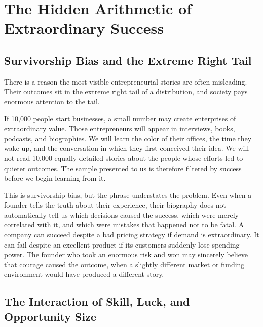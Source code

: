 \section{The Hidden Arithmetic of Extraordinary Success}

\subsection{Survivorship Bias and the Extreme Right Tail}

There is a reason the most visible entrepreneurial stories are often misleading. Their outcomes sit in the extreme right tail of a distribution, and society pays enormous attention to the tail.

If 10,000 people start businesses, a small number may create enterprises of extraordinary value. Those entrepreneurs will appear in interviews, books, podcasts, and biographies. We will learn the color of their offices, the time they wake up, and the conversation in which they first conceived their idea. We will not read 10,000 equally detailed stories about the people whose efforts led to quieter outcomes. The sample presented to us is therefore filtered by success before we begin learning from it.

This is survivorship bias, but the phrase understates the problem. Even when a founder tells the truth about their experience, their biography does not automatically tell us which decisions caused the success, which were merely correlated with it, and which were mistakes that happened not to be fatal. A company can succeed despite a bad pricing strategy if demand is extraordinary. It can fail despite an excellent product if its customers suddenly lose spending power. The founder who took an enormous risk and won may sincerely believe that courage caused the outcome, when a slightly different market or funding environment would have produced a different story.

\subsection{The Interaction of Skill, Luck, and Opportunity Size}

